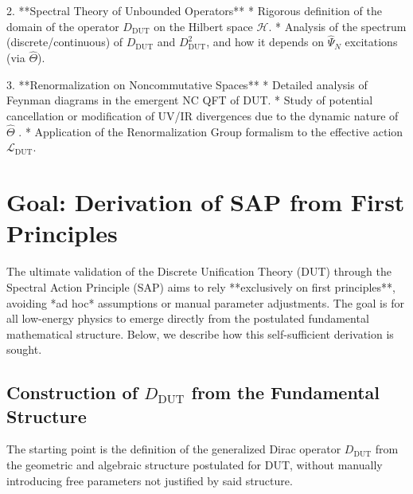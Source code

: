\documentclass[11pt, a4paper]{article}
\theoremstyle{remark}
\newcommand{\Op}[1]{\hat{#1}}
\begin{document}
2.  **Spectral Theory of Unbounded Operators**
    * Rigorous definition of the domain of the operator \( D_{\text{DUT}} \) on the Hilbert space \( \mathcal{H} \).
    * Analysis of the spectrum (discrete/continuous) of \( D_{\text{DUT}} \) and \( D_{\text{DUT}}^2 \), and how it depends on \( \Op{\Psi}_N \) excitations (via \( \Op{\Theta} \)).

3.  **Renormalization on Noncommutative Spaces**
    * Detailed analysis of Feynman diagrams in the emergent NC QFT of DUT.
    * Study of potential cancellation or modification of UV/IR divergences due to the dynamic nature of \( \Op{\Theta} \) \citep{GrosseWulkenhaar2005}.
    * Application of the Renormalization Group formalism to the effective action \( \mathcal{L}_{\text{DUT}} \).


\section{Goal: Derivation of SAP from First Principles}
\label{sec:apendice_pae_principios}

The ultimate validation of the Discrete Unification Theory (DUT) through the Spectral Action Principle (SAP) aims to rely **exclusively on first principles**, avoiding *ad hoc* assumptions or manual parameter adjustments. The goal is for all low-energy physics to emerge directly from the postulated fundamental mathematical structure. Below, we describe how this self-sufficient derivation is sought.

\subsection{Construction of \( D_{\text{DUT}} \) from the Fundamental Structure}
The starting point is the definition of the generalized Dirac operator \( D_{\text{DUT}} \) from the geometric and algebraic structure postulated for DUT, without manually introducing free parameters not justified by said structure.
\end{document}
